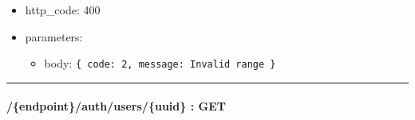\documentclass[
]{article}
\begin{document}
\begin{itemize}
  \begin{itemize}
  \item
    http\_code: 400
  \item
    parameters:

    \begin{itemize}
    \item
      body: \texttt{\{
      \textquotesingle{}code\textquotesingle{}:\ 2,\ 
      \textquotesingle{}message\textquotesingle{}:\ \textquotesingle{}Invalid\ range\textquotesingle{}
      \}}
    \end{itemize}
  \end{itemize}
\end{itemize}

\begin{center}\rule{0.5\linewidth}{0.5pt}\end{center}

\hypertarget{header-n60747}{%
\paragraph{/\{endpoint\}/auth/users/\{uuid\} :
GET}\label{header-n60747}}
\end{document}
